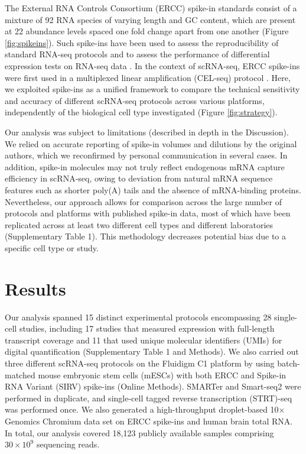 The External RNA Controls Consortium (ERCC) \cite{External_RNA_Controls_Consortium2005-qi} spike-in standards consist of a mixture of 92 RNA species of varying length and GC content, which are present at 22 abundance levels spaced one fold change apart from one another (Figure \ref{fig:spikeins}). Such spike-ins have been used to assess the reproducibility of standard RNA-seq protocols \cite{Jiang2011-nc} and to assess the performance of differential expression tests on RNA-seq data  \cite{Munro2014-tu}. In the context of scRNA-seq, ERCC spike-ins were first used in a multiplexed linear amplification (CEL-seq) protocol \cite{Hashimshony2012-am}. Here, we exploited spike-ins as a unified framework to compare the technical sensitivity and accuracy of different scRNA-seq protocols across various platforms, independently of the biological cell type investigated (Figure \ref{fig:strategy}).

Our analysis was subject to limitations (described in depth in the Discussion). We relied on accurate reporting of spike-in volumes and dilutions by the original authors, which we reconfirmed by personal communication in several cases. In addition, spike-in molecules may not truly reflect endogenous mRNA capture efficiency in scRNA-seq, owing to deviation from natural mRNA sequence features such as shorter poly(A) tails and the absence of mRNA-binding proteins. Nevertheless, our approach allows for comparison across the large number of protocols and platforms with published spike-in data, most of which have been replicated across at least two different cell types and different laboratories (Supplementary Table 1). This methodology decreases potential bias due to a specific cell type or study.

\section{Results}

Our analysis spanned 15 distinct experimental protocols encompassing 28 single-cell studies, including 17 studies that measured expression with full-length transcript coverage and 11 that used unique molecular identifiers (UMIs) for digital quantification (Supplementary Table 1 and Methods). We also carried out three different scRNA-seq protocols on the Fluidigm C1 platform by using batch-matched mouse embryonic stem cells (mESCs) with both ERCC and Spike-in RNA Variant (SIRV) spike-ins (Online Methods). SMARTer and Smart-seq2 were performed in duplicate, and single-cell tagged reverse transcription (STRT)-seq was performed once. We also generated a high-throughput droplet-based 10× Genomics Chromium data set on ERCC spike-ins and human brain total RNA. In total, our analysis covered 18,123 publicly available samples comprising \( 30 \times 10^9 \) sequencing reads.

